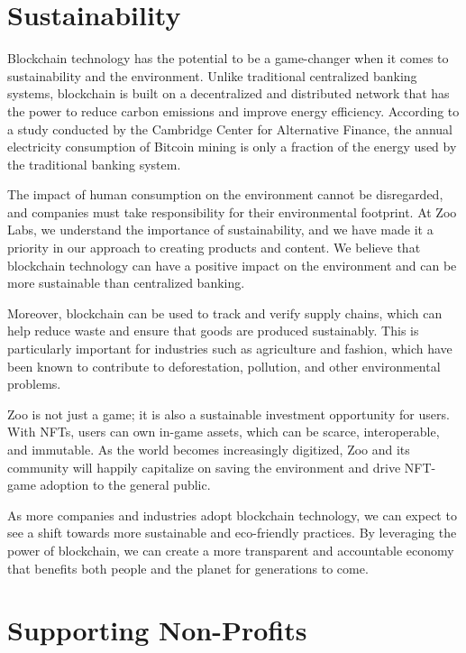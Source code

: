 \section{Sustainability}
\label{sec:sustainability}

Blockchain technology has the potential to be a game-changer when it comes to sustainability and the environment. Unlike traditional centralized banking systems, blockchain is built on a decentralized and distributed network that has the power to reduce carbon emissions and improve energy efficiency. According to a study conducted by the Cambridge Center for Alternative Finance, the annual electricity consumption of Bitcoin mining is only a fraction of the energy used by the traditional banking system.

The impact of human consumption on the environment cannot be disregarded, and companies must take responsibility for their environmental footprint. At Zoo Labs, we understand the importance of sustainability, and we have made it a priority in our approach to creating products and content. We believe that blockchain technology can have a positive impact on the environment and can be more sustainable than centralized banking.

Moreover, blockchain can be used to track and verify supply chains, which can help reduce waste and ensure that goods are produced sustainably. This is particularly important for industries such as agriculture and fashion, which have been known to contribute to deforestation, pollution, and other environmental problems.

Zoo is not just a game; it is also a sustainable investment opportunity for users. With NFTs, users can own in-game assets, which can be scarce, interoperable, and immutable. As the world becomes increasingly digitized, Zoo and its community will happily capitalize on saving the environment and drive NFT-game adoption to the general public.

As more companies and industries adopt blockchain technology, we can expect to see a shift towards more sustainable and eco-friendly practices. By leveraging the power of blockchain, we can create a more transparent and accountable economy that benefits both people and the planet for generations to come.

\section{Supporting Non-Profits}
\label{sec:nonprofits}

